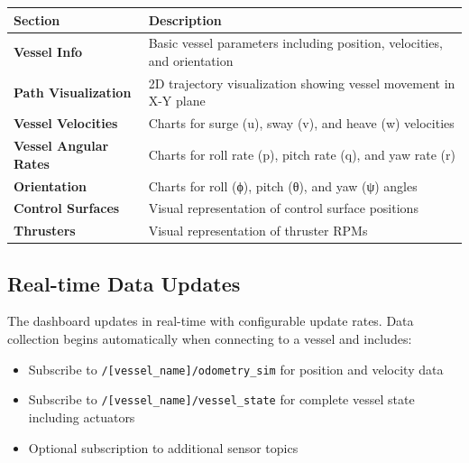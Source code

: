 \documentclass[
  letterpaper,
  DIV=11,
  numbers=noendperiod]{scrreprt}
\providecommand{\tightlist}{%
  \setlength{\itemsep}{0pt}\setlength{\parskip}{0pt}}\usepackage{longtable,booktabs,array}
\begin{document}
\begin{longtable}[]{@{}
  >{\raggedright\arraybackslash}p{}
  >{\raggedright\arraybackslash}p{}@{}}
\toprule\noalign{}
\begin{minipage}[b]{\linewidth}\raggedright
Section
\end{minipage} & \begin{minipage}[b]{\linewidth}\raggedright
Description
\end{minipage} \\
\midrule\noalign{}
\endhead
\bottomrule\noalign{}
\endlastfoot
\textbf{Vessel Info} & Basic vessel parameters including position,
velocities, and orientation \\
\textbf{Path Visualization} & 2D trajectory visualization showing vessel
movement in X-Y plane \\
\textbf{Vessel Velocities} & Charts for surge (u), sway (v), and heave
(w) velocities \\
\textbf{Vessel Angular Rates} & Charts for roll rate (p), pitch rate
(q), and yaw rate (r) \\
\textbf{Orientation} & Charts for roll (ϕ), pitch (θ), and yaw (ψ)
angles \\
\textbf{Control Surfaces} & Visual representation of control surface
positions \\
\textbf{Thrusters} & Visual representation of thruster RPMs \\
\end{longtable}

\subsection*{Real-time Data Updates}\label{real-time-data-updates}

The dashboard updates in real-time with configurable update rates. Data
collection begins automatically when connecting to a vessel and
includes:

\begin{itemize}
\tightlist
\item
  Subscribe to \texttt{/{[}vessel\_name{]}/odometry\_sim} for position
  and velocity data
\item
  Subscribe to \texttt{/{[}vessel\_name{]}/vessel\_state} for complete
  vessel state including actuators
\item
  Optional subscription to additional sensor topics
\end{itemize}
\end{document}
